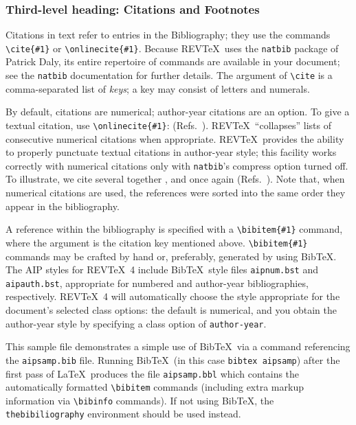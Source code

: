 \documentclass[%
 aip,
 jmp,%
 amsmath,amssymb,
 reprint,%
]{revtex4-1}
\begin{document}
\subsubsection{\label{sec:level3}Third-level heading: Citations and Footnotes}

Citations in text refer to entries in the Bibliography;
they use the commands \verb+\cite{#1}+ or \verb+\onlinecite{#1}+. 
Because REV\TeX\ uses the \verb+natbib+ package of Patrick Daly, 
its entire repertoire of commands are available in your document;
see the \verb+natbib+ documentation for further details.
The argument of \verb+\cite+ is a comma-separated list of \emph{keys};
a key may consist of letters and numerals. 

By default, citations are numerical; \cite{feyn54} author-year citations are an option. 
To give a textual citation, use \verb+\onlinecite{#1}+: (Refs.~). 
REV\TeX\ ``collapses'' lists of consecutive numerical citations when appropriate. 
REV\TeX\ provides the ability to properly punctuate textual citations in author-year style;
this facility works correctly with numerical citations only with \texttt{natbib}'s compress option turned off. 
To illustrate, we cite several together \cite{feyn54,witten2001,epr,Berman1983}, 
and once again (Refs.~). 
Note that, when numerical citations are used, the references were sorted into the same order they appear in the bibliography. 

A reference within the bibliography is specified with a \verb+\bibitem{#1}+ command,
where the argument is the citation key mentioned above. 
\verb+\bibitem{#1}+ commands may be crafted by hand or, preferably,
generated by using Bib\TeX. 
The AIP styles for REV\TeX~4 include Bib\TeX\ style files
\verb+aipnum.bst+ and \verb+aipauth.bst+, appropriate for
numbered and author-year bibliographies,
respectively. 
REV\TeX~4 will automatically choose the style appropriate for 
the document's selected class options: the default is numerical, and
you obtain the author-year style by specifying a class option of \verb+author-year+.

This sample file demonstrates a simple use of Bib\TeX\ 
via a \verb++ command referencing the \verb+aipsamp.bib+ file.
Running Bib\TeX\ (in this case \texttt{bibtex
aipsamp}) after the first pass of \LaTeX\ produces the file
\verb+aipsamp.bbl+ which contains the automatically formatted
\verb+\bibitem+ commands (including extra markup information via
\verb+\bibinfo+ commands). If not using Bib\TeX, the
\verb+thebibiliography+ environment should be used instead.
\end{document}
